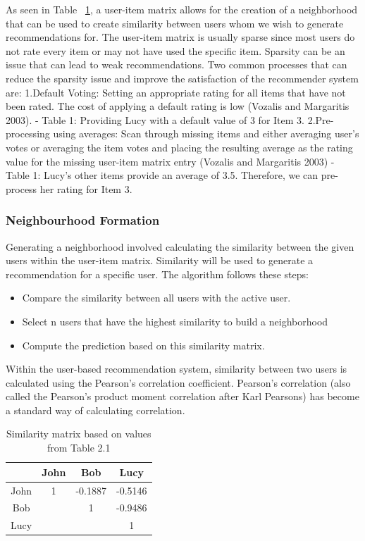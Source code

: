 As seen in Table ~\ref{table:3}, a user-item matrix allows for the creation of a neighborhood that can be used to create similarity between users whom we wish to generate recommendations for. The user-item matrix is usually sparse since most users do not rate every item or may not have used the specific item.
Sparsity can be an issue that can lead to weak recommendations. Two common processes that can reduce the sparsity issue and improve the satisfaction of the recommender system are:
1.Default Voting: Setting an appropriate rating for all items that have not been rated. The cost of applying a default rating is low (Vozalis and Margaritis 2003).   - Table 1: Providing Lucy with a default value of 3 for Item 3.
2.Pre-processing using averages: Scan through missing items and either averaging user’s votes or averaging the item votes and placing the resulting average as the rating value for the missing user-item matrix entry (Vozalis and Margaritis 2003)    - Table 1: Lucy’s other items provide an average of 3.5. Therefore, we can pre-process her rating for Item 3.

\subsubsection{Neighbourhood Formation}
Generating a neighborhood involved calculating the similarity between the given users within the user-item matrix. Similarity will be used to generate a recommendation for a specific user.
The algorithm follows these steps:
\begin{itemize}
\item Compare the similarity between all users with the active user.
\item Select n users that have the highest similarity to build a neighborhood
\item Compute the prediction based on this similarity matrix.
\end{itemize}
Within the user-based recommendation system, similarity between two users is calculated using the Pearson’s correlation coefficient. Pearson’s correlation (also called the Pearson's product moment correlation after Karl Pearsons) has become a standard way of calculating correlation.

\begin{table}[ht]
\caption{Similarity matrix based on values from Table 2.1} %
\centering  %
\begin{tabular}{c c c c} %
\hline\hline                        %
 & John & Bob& Lucy \\ [0.5ex] %
\hline                  %

John & 1 & -0.1887  & -0.5146 \\
Bob &  & 1 & -0.9486 \\
Lucy &  & & 1 \\[1ex]      %
\hline %
\end{tabular}
\label{table:3} %
\end{table}

